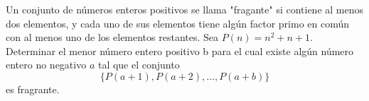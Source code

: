Un conjunto de números enteros positivos se llama "fragante" si contiene al menos dos elementos, y cada uno de sus elementos tiene algún factor primo en común con al menos uno de los elementos restantes. Sea $P (n) = n^2 + n + 1$. Determinar el menor número entero positivo b para el cual existe algún número entero no negativo $a$ tal que el conjunto
\[\{P(a+1),P(a+2),\dots,P(a+b)\}\]
es fragrante.